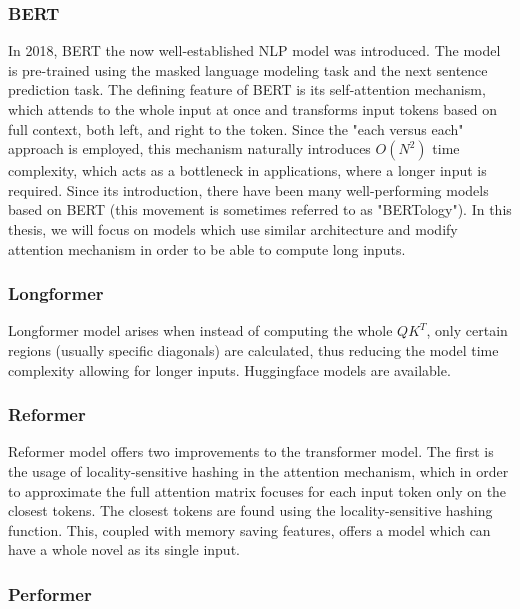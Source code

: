 \subsubsection{BERT}
In 2018, BERT \citep{bert} the now well-established NLP model was introduced. The model is pre-trained using the masked language modeling task and the next sentence prediction task.
The defining feature of BERT is its self-attention mechanism, which attends to the whole input at once and transforms input tokens based on full context, both left, and right to the token.
Since the "each versus each" approach is employed, this mechanism naturally introduces $O(N^2)$ time complexity, which acts as a bottleneck in applications, where a longer input is required.
Since its introduction, there have been many well-performing models based on BERT (this movement is sometimes referred to as "BERTology").
In this thesis, we will focus on models which use similar architecture and modify attention mechanism in order to be able to compute long inputs.

\subsubsection{Longformer}

Longformer model \citep{longformer} arises when instead of computing the whole $QK^T$, only certain regions (usually specific diagonals) are calculated, thus reducing the model time complexity allowing for longer inputs.
Huggingface models are available.

\subsubsection{Reformer}

Reformer model \citep{reformer} offers two improvements to the transformer model.
The first is the usage of locality-sensitive hashing in the attention mechanism, which in order to approximate the full attention matrix focuses for each input token only on the closest tokens.
The closest tokens are found using the locality-sensitive hashing function.
This, coupled with memory saving features, offers a model which can have a whole novel as its single input.

\subsubsection{Performer}

